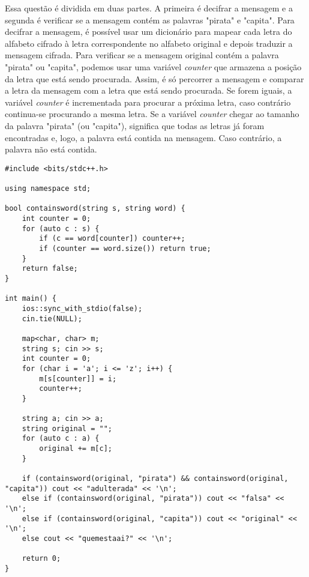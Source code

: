 \documentclass[11pt,fancychapters]{article}
\begin{document}
\noindent
Essa questão é dividida em duas partes. A primeira é decifrar a mensagem e a segunda é verificar se a mensagem contém as palavras "pirata" e "capita". Para decifrar a mensagem, é possível usar um dicionário para mapear cada letra do alfabeto cifrado à letra correspondente no alfabeto original e depois traduzir a mensagem cifrada. Para verificar se a mensagem original contém a palavra "pirata" ou "capita", podemos usar uma variável  \emph{counter} que armazena a posição da letra que está sendo procurada. Assim, é só percorrer a mensagem e comparar a letra da mensagem com a letra que está sendo procurada. Se forem iguais, a variável \emph{counter} é incrementada para procurar a próxima letra, caso contrário continua-se procurando a mesma letra. Se a variável \emph{counter} chegar ao tamanho da palavra "pirata" (ou "capita"), significa que todas as letras já foram encontradas e, logo, a palavra está contida na mensagem. Caso contrário, a palavra não está contida.\\
\begin{lstlisting}[style=c++]
#include <bits/stdc++.h>
 
using namespace std;
 
bool containsword(string s, string word) {
    int counter = 0;
    for (auto c : s) {
        if (c == word[counter]) counter++;
        if (counter == word.size()) return true;
    }
    return false;
}
 
int main() {
    ios::sync_with_stdio(false);
    cin.tie(NULL);
    
    map<char, char> m;
    string s; cin >> s;
    int counter = 0;
    for (char i = 'a'; i <= 'z'; i++) {
        m[s[counter]] = i;
        counter++;
    }
    
    string a; cin >> a;
    string original = "";
    for (auto c : a) {
        original += m[c];
    }
    
    if (containsword(original, "pirata") && containsword(original, "capita")) cout << "adulterada" << '\n';
    else if (containsword(original, "pirata")) cout << "falsa" << '\n';
    else if (containsword(original, "capita")) cout << "original" << '\n';
    else cout << "quemestaai?" << '\n';
 
    return 0;
}
\end{lstlisting}
\newpage
\end{document}
